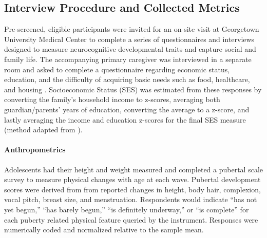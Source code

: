 \documentclass[utf8]{frontiersSCNS} %
\begin{document}
\subsection{Interview Procedure and Collected Metrics} Pre-screened, eligible participants were invited for an on-site visit at Georgetown University Medical Center to complete a series of questionnaires and interviews designed to measure neurocognitive developmental traits and capture social and family life. The accompanying primary caregiver was interviewed in a separate room and asked to complete a questionnaire regarding economic status, education, and the difficulty of acquiring basic needs such as food, healthcare, and housing \citep{bornstein2003socioeconomic}. Socioeconomic Status (SES) was estimated from these responses by converting the family’s household income to z-scores, averaging both guardian/parents' years of education, converting the average to a z-score, and lastly averaging the income and education z-scores for the final SES measure (method adapted from \cite{manuck2010ses}).
\paragraph{Anthropometrics} Adolescents had their height and weight measured and completed a pubertal scale survey \citep{carskadon1993self} to measure physical changes with age at each wave. Pubertal development scores were derived from from reported changes in height, body hair, complexion, vocal pitch, breast size, and menstruation. Respondents would indicate “has not yet begun,” “has barely begun,” “is definitely underway,” or “is complete” for each puberty related physical feature queried by the instrument. Responses were numerically coded and normalized relative to the sample mean.
\end{document}
